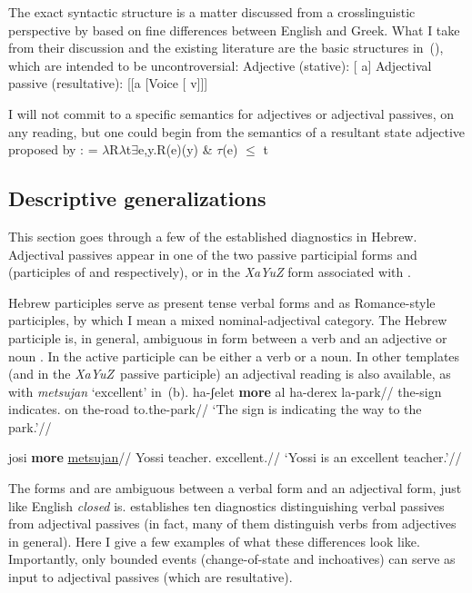 The exact syntactic structure is a matter discussed from a crosslinguistic perspective by \cite{alexiadouetal14,layering15} based on fine differences between English and Greek. What I take from their discussion and the existing literature are the basic structures in~(\nextx), which are intended to be uncontroversial:
\pex
	\a Adjective (stative): {[} a]
	\a Adjectival passive (resultative): {[}[a [Voice [ v]]]
\xe

I will not commit to a specific semantics for adjectives or adjectival passives, on any reading, but one could begin from the semantics of a resultant state adjective proposed by \cite{kratzer00bls}:
\ex {} = $\lambda$R$\lambda$t$\exists$e,y.R(e)(y) \& $\tau$(e) $\le$ t
\xe

	\subsection{Descriptive generalizations} \label{passn:adjpass:mpua}
This section goes through a few of the established diagnostics in Hebrew. Adjectival passives appear in one of the two passive participial forms {\mpua} and {\mhuf} (participles of {\tpua} and {\thuf} respectively), or in the \emph{XaYuZ} form associated with \tkal.

Hebrew participles serve as present tense verbal forms and as Romance-style participles, by which I mean a mixed nominal-adjectival category. The Hebrew participle is, in general, ambiguous in form between a verb and an adjective or noun \citep{boneh13tense,doron13ehll}. In {\tkal} the active participle can be either a verb or a noun. In other templates (and in the \emph{XaYuZ}~passive participle) an adjectival reading is also available, as with \emph{metsujan} `excellent' in~(\nextx b).
\pex
	\a \begingl
		\gla ha-ʃelet \textbf{more} al ha-derex la-park//
		\glb the-sign indicates. on the-road to.the-park//
		\glft `The sign is indicating the way to the park.'//
	\endgl
	
	\a \begingl
		\gla josi \textbf{more} \underline{metsujan}//
		\glb Yossi teacher. excellent.//
		\glft `Yossi is an excellent teacher.'//
	\endgl
\xe

The forms {\mpua} and {\mhuf} are ambiguous between a verbal form and an adjectival form, just like English \emph{closed} is. \cite{doron00} establishes ten diagnostics distinguishing verbal passives from adjectival passives (in fact, many of them distinguish verbs from adjectives in general). Here I give a few examples of what these differences look like. Importantly, only bounded events (change-of-state and inchoatives) can serve as input to adjectival passives (which are resultative).

